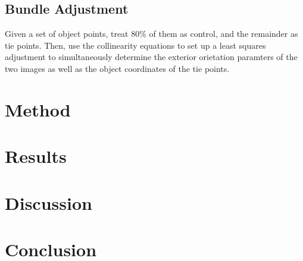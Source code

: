 \documentclass{article}
\begin{document}
\subsection{Bundle Adjustment}
Given a set of object points, treat 80\% of them as control, and the remainder as tie points. Then, use the collinearity equations to set up a least squares adjustment to simultaneously determine the exterior orietation paramters of the two images as well as the object coordinates of the tie points.


\section{Method}

\section{Results}

\section{Discussion}

\section{Conclusion}
\end{document}
